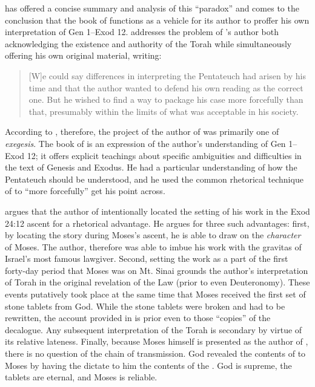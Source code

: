 \vanderkam has offered a concise summary and analysis of this ``\psgraphical paradox'' and comes to the conclusion that the book of \jub functions as a vehicle for its author to proffer his own interpretation of Gen 1--Exod 12. \vanderkam addresses the problem of \jub's author both acknowledging the existence and authority of the Torah while simultaneously offering his own original material, writing:

\begin{quote}
    [W]e could say differences in interpreting the Pentateuch had arisen by his time and that the author wanted to defend his own reading as the correct one. But he wished to find a way to package his case more forcefully than that, presumably within the limits of what was acceptable in his society.\autocite[28]{vanderkam_metso-etal2010}
\end{quote}

\noindent
According to \vanderkam, therefore, the project of the author of \jub was primarily one of \emph{exegesis}. The book of \jub is an expression of the author's understanding of Gen 1--Exod 12; it offers explicit teachings about specific ambiguities and difficulties in the text of Genesis and Exodus. He had a particular understanding of how the Pentateuch should be understood, and he used the common rhetorical technique of \psy to ``more forcefully'' get his point across.%
    \autocite[28]{vanderkam_metso-etal2010}

\vanderkam argues that the author of \jub intentionally located the setting of his work in the Exod 24:12 ascent for a rhetorical advantage. He argues for three such advantages: first, by locating the story during Moses's ascent, he is able to draw on the \emph{character} of Moses. The author, therefore was able to imbue his work with the gravitas of Israel's most famous lawgiver. Second, setting the work as a part of the first forty-day period that Moses was on Mt. Sinai grounds the author's interpretation of Torah in the original revelation of the Law (prior to even Deuteronomy). These events putatively took place at the same time that Moses received the first set of stone tablets from God. While the stone tablets were broken and had to be rewritten, the account provided in \jub is prior even to those ``copies'' of the decalogue. Any subsequent interpretation of the Torah is secondary by virtue of its relative lateness. Finally, because Moses himself is presented as the author of \jub, there is no question of the chain of transmission. God revealed the contents of \jub to Moses by having the \ap dictate to him the contents of the \heavenlytablets. God is supreme, the tablets are eternal, and Moses is reliable.

